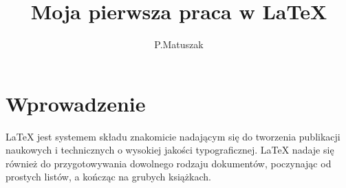 \documentclass{article}
\author{P.Matuszak}
\title{Moja pierwsza praca w LaTeX}
\begin{document}
\maketitle
\tableofcontents
\section{Wprowadzenie}
LaTeX jest systemem składu znakomicie nadającym się do tworzenia publikacji naukowych i technicznych o wysokiej jakości typograficznej. LaTeX nadaje się również do przygotowywania dowolnego rodzaju dokumentów,
poczynając od prostych listów, a kończąc na grubych książkach.
\end{document}
